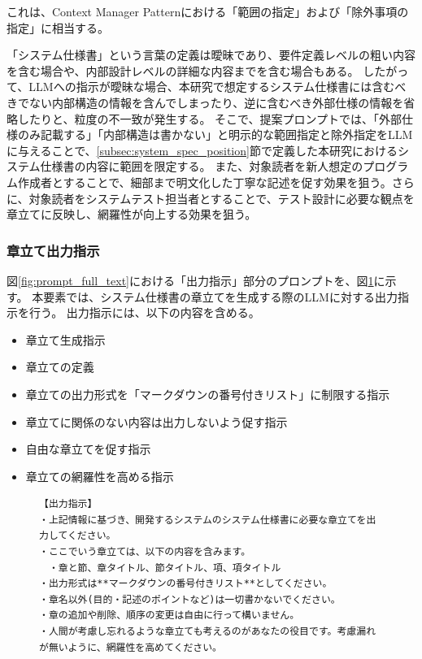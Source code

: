 これは、Context Manager Patternにおける「範囲の指定」および「除外事項の指定」に相当する。

「システム仕様書」という言葉の定義は曖昧であり、要件定義レベルの粗い内容を含む場合や、内部設計レベルの詳細な内容までを含む場合もある\cite{software_engineering}。
したがって、LLMへの指示が曖昧な場合、本研究で想定するシステム仕様書には含むべきでない内部構造の情報を含んでしまったり、逆に含むべき外部仕様の情報を省略したりと、粒度の不一致が発生する。
そこで、提案プロンプトでは、「外部仕様のみ記載する」「内部構造は書かない」と明示的な範囲指定と除外指定をLLMに与えることで、\ref{subsec:system_spec_position}節で定義した本研究におけるシステム仕様書の内容に範囲を限定する。
また、対象読者を新人想定のプログラム作成者とすることで、細部まで明文化した丁寧な記述を促す効果を狙う。さらに、対象読者をシステムテスト担当者とすることで、テスト設計に必要な観点を章立てに反映し、網羅性が向上する効果を狙う。

\subsubsection{章立て出力指示}

図\ref{fig:prompt_full_text}における「出力指示」部分のプロンプトを、図\ref{fig:output_instruction}に示す。
本要素では、システム仕様書の章立てを生成する際のLLMに対する出力指示を行う。
出力指示には、以下の内容を含める。
\begin{itemize}
  \item 章立て生成指示
  \item 章立ての定義
  \item 章立ての出力形式を「マークダウンの番号付きリスト」に制限する指示
  \item 章立てに関係のない内容は出力しないよう促す指示
  \item 自由な章立てを促す指示
  \item 章立ての網羅性を高める指示
\end{itemize}


\begin{figure}[tp]
\begin{tcolorbox}[
  colback=white,
  colframe=blue,
  fonttitle=\bfseries,
]
\footnotesize
\ttfamily
\fontsize{10}{11}\selectfont
\begin{verbatim}
【出力指示】
・上記情報に基づき、開発するシステムのシステム仕様書に必要な章立てを出力してください。
・ここでいう章立ては、以下の内容を含みます。
　・章と節、章タイトル、節タイトル、項、項タイトル 
・出力形式は**マークダウンの番号付きリスト**としてください。 
・章名以外(目的・記述のポイントなど)は一切書かないでください。 
・章の追加や削除、順序の変更は自由に行って構いません。
・人間が考慮し忘れるような章立ても考えるのがあなたの役目です。考慮漏れが無いように、網羅性を高めてください。
\end{verbatim}
\end{tcolorbox}
\par\vspace{-20pt}
\label{fig:output_instruction}
\end{figure}


